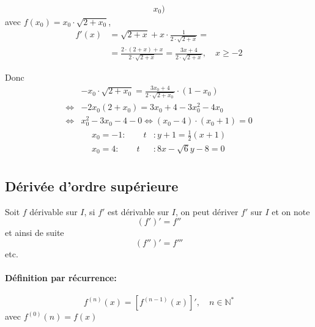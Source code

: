 \documentclass[
    11pt,
    a4paper,
    oneside,
    headinlcude, footinclude,
    twoside,
]{report}
\begin{document}
\begin{enumerate}
\begin{center}
\begin{minipage}{.49\linewidth}
\[\begin{split}
                       x_{0}) 
                    \end{split}
                \]
                avec $f(x_{0}) = x_{0} \cdot \sqrt{2 + x_{0}}$,
                \[
                    \begin{split}
                        f'(x) &= \sqrt{2 + x} + x \cdot \frac{1}{2 \cdot
                        \sqrt{2 + x}}=\\
                        &= \frac{2 \cdot (2 + x)+x}{2 \cdot \sqrt{2 + x}} =
                        \frac{3x + 4}{2 \cdot \sqrt{2 + x}}, \quad x\geq
                        -2
                    \end{split}
                \]
            \end{minipage}
        \end{center}
        Donc
        \[
            \begin{split}
                &-x_{0} \cdot \sqrt{ 2 + x_{0} } = \frac{3 x_{0} + 4}{2 \cdot
                \sqrt{2 + x_{0}}} \cdot (1 - x_{0})\\
                \iff& - 2 x_{0} (2 + x_{0}) = 3 x_{0} + 4 - 3 x_{0}^{2} - 4
                x_{0} \\
                \iff& x_{0}^{2} - 3x_{0} - 4 - 0 \iff (x_{0} - 4)\cdot (x_{0} + 1) =0 
            \end{split}
        \]
        \[
            \begin{split}
                x_{0} = -1 :\quad \quad  t &: y + 1 = \frac{1}{2} ( x + 1 )\\
                x_{0} = 4 :\quad \quad  t &: 8x -\sqrt{6}y - 8 = 0\\
            \end{split}
        \]
\end{enumerate}

\subsection{Dérivée d'ordre supérieure}
\label{sub:derivee_d_ordre_superieure}

Soit $f$ dérivable sur $I$, si $f'$ est dérivable sur $I$, on peut dériver $f'$
sur $I$ et on note $$(f')' = f''$$
et ainsi de suite $$(f'')' =f''' $$
etc.

\paragraph{Définition par récurrence:}

$$f^{(n)}(x) = [f^{(n-1)}(x)]', \quad n \in \mathbb{N}^{*}$$
avec $f^{(0)}(n) = f(x)$
\end{document}
